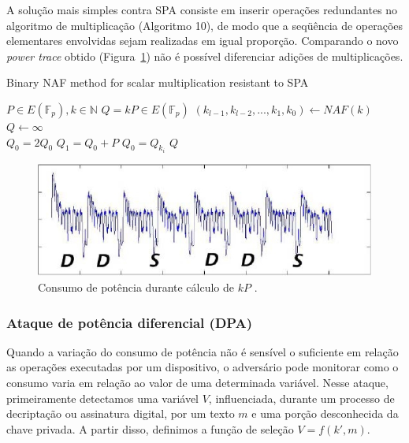 A solu\c{c}\~{a}o mais simples contra SPA consiste em inserir opera\c{c}\~{o}es redundantes no algoritmo de multiplica\c{c}\~{a}o (Algoritmo 10), de modo que a seq\"{u}\^{e}ncia de opera\c{c}\~{o}es elementares envolvidas sejam realizadas em igual propor\c{c}\~{a}o. Comparando o novo \textit{power trace} obtido (Figura~\ref{fig:Fig7}) n\~{a}o \'{e} poss\'{i}vel diferenciar adi\c{c}\~{o}es de multiplica\c{c}\~{o}es.

\begin{algorithm}[H]
\caption{Binary NAF method for scalar multiplication resistant to SPA}
\begin{algorithmic}
    \REQUIRE $P \in E(\mathbb{F}_p), k \in \mathbb{N}$
    \ENSURE $Q = kP \in E(\mathbb{F}_p)$
    \STATE $(k_{l-1}, k_{l-2}, ..., k_{1}, k_{0}) \leftarrow NAF(k)$
    \STATE $Q \leftarrow \infty$\\
        \STATE $Q_{0} = 2Q_{0}$
        \STATE $Q_{1} = Q_{0} + P$
        \STATE $Q_{0} = Q_{k_{i}}$
    \ENDFOR
    \RETURN $Q$
    \end{algorithmic}
\end{algorithm}

\begin{figure}[ht]
	\centering
	\includegraphics[width=.8\textwidth]{figures/spa2.jpg}
	\caption{Consumo de pot\^{e}ncia durante c\'{a}lculo de $kP$ \cite{ECCBook_HankersonVanstone2004}.}
	\label{fig:Fig7}
\end{figure}

\subsubsection{Ataque de potência diferencial (DPA)}
Quando a varia\c{c}\~{a}o do consumo de pot\^{e}ncia n\~{a}o \'{e} sens\'{i}vel o suficiente em rela\c{c}\~{a}o as opera\c{c}\~{o}es executadas por um dispositivo, o advers\'{a}rio pode monitorar como o consumo varia em rela\c{c}\~{a}o ao valor de uma determinada vari\'{a}vel. Nesse ataque, primeiramente detectamos uma vari\'{a}vel $V$, influenciada, durante um processo de decripta\c{c}\~{a}o ou assinatura digital, por um texto $m$ e uma por\c{c}\~{a}o desconhecida  da chave privada. A partir disso, definimos a fun\c{c}\~{a}o de sele\c{c}\~{a}o $V = f(k',m)$.

